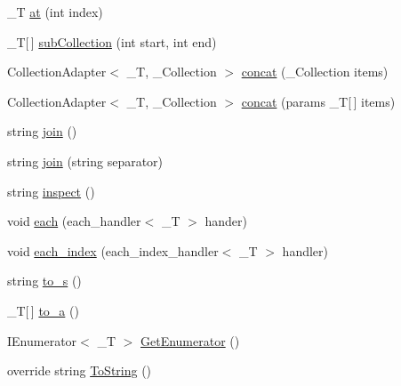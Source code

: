 \begin{DoxyCompactItemize}
\item 
\_\-T \hyperlink{classlazurite_1_1attitude_1_1_collection_adapter_3_01___t_00_01___collection_01_4_af303ff4c011ea4ddcec02b7e5e0bd399}{at} (int index)
\item 
\_\-T\mbox{[}$\,$\mbox{]} \hyperlink{classlazurite_1_1attitude_1_1_collection_adapter_3_01___t_00_01___collection_01_4_aa519a6f4c9cfedeacfadca30c3fce4f9}{subCollection} (int start, int end)
\item 
CollectionAdapter$<$ \_\-T, \_\-Collection $>$ \hyperlink{classlazurite_1_1attitude_1_1_collection_adapter_3_01___t_00_01___collection_01_4_a918c545b4a308f24bc15c42fbfe10d9a}{concat} (\_\-Collection items)
\item 
CollectionAdapter$<$ \_\-T, \_\-Collection $>$ \hyperlink{classlazurite_1_1attitude_1_1_collection_adapter_3_01___t_00_01___collection_01_4_a98365702ff0b4a0a3a794854e3141ba4}{concat} (params \_\-T\mbox{[}$\,$\mbox{]} items)
\item 
string \hyperlink{classlazurite_1_1attitude_1_1_collection_adapter_3_01___t_00_01___collection_01_4_ae160d2f2c6c54de7694a0b38eed61809}{join} ()
\item 
string \hyperlink{classlazurite_1_1attitude_1_1_collection_adapter_3_01___t_00_01___collection_01_4_a711d862935d2f75aeb51b3e2a880580f}{join} (string separator)
\item 
string \hyperlink{classlazurite_1_1attitude_1_1_collection_adapter_3_01___t_00_01___collection_01_4_a1d80bf87069fedc91947a37300e4b98e}{inspect} ()
\item 
void \hyperlink{classlazurite_1_1attitude_1_1_collection_adapter_3_01___t_00_01___collection_01_4_a25a44d143fd48762a8ebb7de08614b05}{each} (each\_\-handler$<$ \_\-T $>$ hander)
\item 
void \hyperlink{classlazurite_1_1attitude_1_1_collection_adapter_3_01___t_00_01___collection_01_4_a30edef4c0d9445b04b69a2308b88b1c5}{each\_\-index} (each\_\-index\_\-handler$<$ \_\-T $>$ handler)
\item 
string \hyperlink{classlazurite_1_1attitude_1_1_collection_adapter_3_01___t_00_01___collection_01_4_a46d7e822b65077e37a97327b8048c094}{to\_\-s} ()
\item 
\_\-T\mbox{[}$\,$\mbox{]} \hyperlink{classlazurite_1_1attitude_1_1_collection_adapter_3_01___t_00_01___collection_01_4_a388a36a912ff043859921c36f1ee1552}{to\_\-a} ()
\item 
IEnumerator$<$ \_\-T $>$ \hyperlink{classlazurite_1_1attitude_1_1_collection_adapter_3_01___t_00_01___collection_01_4_a0c0fe3a99412b13632b28b92a759d537}{GetEnumerator} ()
\item 
override string \hyperlink{classlazurite_1_1attitude_1_1_collection_adapter_3_01___t_00_01___collection_01_4_a593935e53ce96be4af7f5f563524ca02}{ToString} ()
\end{DoxyCompactItemize}
